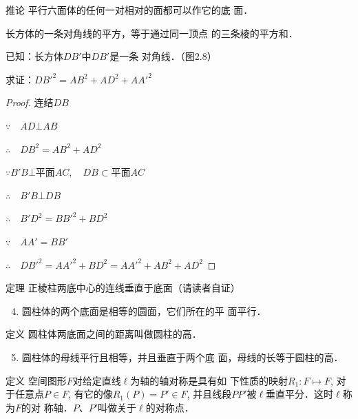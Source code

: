 \begin{blk}
    {推论} 平行六面体的任何一对相对的面都可以作它的底
面．
\end{blk}

\begin{example}
    长方体的一条对角线的平方，等于通过同一顶点
的三条棱的平方和．

已知：长方体$DB'$中$DB'$是一条
对角线．（图2.8）

求证：${DB'}^2=AB^2+AD^2+{AA'}^2$
\end{example}

\begin{proof}
    连结$DB$

$\because\quad  AD\bot AB$

$\therefore\quad DB^2=AB^2+AD^2$

$\because B'B\bot\text{平面}AC,\quad DB\subset \text{平面}AC$
    
$\therefore\quad B'B\bot DB$

$\therefore\quad B'D^2={BB'}^2+BD^2$

$\because\quad AA'=BB'$

$\therefore\quad {DB'}^2={AA'}^2+{BD}^2={AA'}^2+AB^2+AD^2$
\end{proof}

\begin{blk}
   {定理} 正棱柱两底中心的连线垂直于底面（请读者自证）
\end{blk}

\begin{enumerate}\setcounter{enumi}{3}
\item 圆柱体的两个底面是相等的圆面，它们所在的平
面平行．
\end{enumerate}

\begin{blk}{定义}
    圆柱体两底面之间的距离叫做圆柱的高．
\end{blk}

\begin{enumerate}\setcounter{enumi}{4}
\item 圆柱体的母线平行且相等，并且垂直于两个底
面，母线的长等于圆柱的高．
\end{enumerate}

\begin{blk}{定义}
空间图形$F$对给定直线$\ell$为轴的轴对称是具有如
下性质的映射$R_1:F\mapsto F$, 对于任意点$P\in F$, 有它的像$R_1(P)
=P'\in F$, 并且线段$PP'$被$\ell$垂直平分．这时$\ell$称为$F$的对
称轴．$P$、$P'$叫做关于$\ell$的对称点．
\end{blk}

